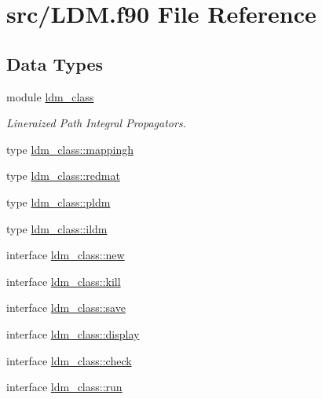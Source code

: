 \hypertarget{_l_d_m_8f90}{\section{src/\+L\+D\+M.f90 File Reference}
\label{_l_d_m_8f90}
}
\subsection*{Data Types}
\begin{DoxyCompactItemize}
\item 
module \hyperlink{classldm__class}{ldm\+\_\+class}
\begin{DoxyCompactList}\small\item\em Lineraized Path Integral Propagators. \end{DoxyCompactList}\item 
type \hyperlink{structldm__class_1_1mappingh}{ldm\+\_\+class\+::mappingh}
\item 
type \hyperlink{structldm__class_1_1redmat}{ldm\+\_\+class\+::redmat}
\item 
type \hyperlink{structldm__class_1_1pldm}{ldm\+\_\+class\+::pldm}
\item 
type \hyperlink{structldm__class_1_1ildm}{ldm\+\_\+class\+::ildm}
\item 
interface \hyperlink{interfaceldm__class_1_1new}{ldm\+\_\+class\+::new}
\item 
interface \hyperlink{interfaceldm__class_1_1kill}{ldm\+\_\+class\+::kill}
\item 
interface \hyperlink{interfaceldm__class_1_1save}{ldm\+\_\+class\+::save}
\item 
interface \hyperlink{interfaceldm__class_1_1display}{ldm\+\_\+class\+::display}
\item 
interface \hyperlink{interfaceldm__class_1_1check}{ldm\+\_\+class\+::check}
\item 
interface \hyperlink{interfaceldm__class_1_1run}{ldm\+\_\+class\+::run}
\end{DoxyCompactItemize}
